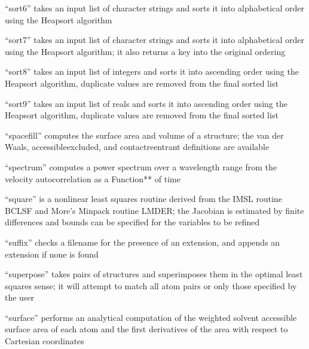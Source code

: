\documentclass[letterpaper,11pt,english]{sphinxmanual}
\begin{document}

“sort6” takes an input list of character strings and sorts it into alphabetical order using the Heapsort algorithm


“sort7” takes an input list of character strings and sorts it into alphabetical order using the Heapsort algorithm; it also returns a key into the original ordering


“sort8” takes an input list of integers and sorts it into ascending order using the Heapsort algorithm, duplicate values are removed from the final sorted list


“sort9” takes an input list of reals and sorts it into ascending order using the Heapsort algorithm, duplicate values are removed from the final sorted list


“spacefill” computes the surface area and volume of a structure; the van der Waals, accessible\sphinxhyphen{}excluded, and contact\sphinxhyphen{}reentrant definitions are available


“spectrum” computes a power spectrum over a wavelength range from the velocity autocorrelation as a Function** of time


“square” is a nonlinear least squares routine derived from the IMSL routine BCLSF and More’s Minpack routine LMDER; the Jacobian is estimated by finite differences and bounds can be specified for the variables to be refined


“suffix” checks a filename for the presence of an extension, and appends an extension if none is found


“superpose” takes pairs of structures and superimposes them in the optimal least squares sense; it will attempt to match all atom pairs or only those specified by the user


“surface” performs an analytical computation of the weighted solvent accessible surface area of each atom and the first derivatives of the area with respect to Cartesian coordinates
\end{document}
